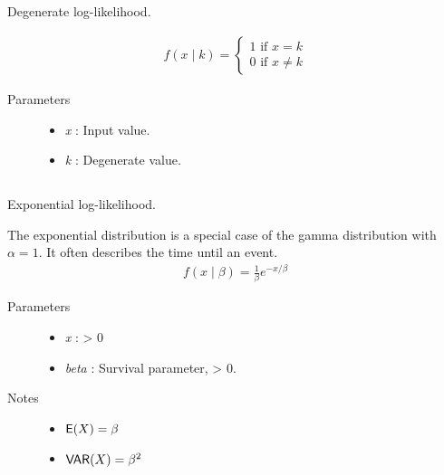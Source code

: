 \documentclass[]{jss}
\begin{document}
\subsection[degenerate]{}

Degenerate log-likelihood.

\begin{eqnarray*}
f(x \mid k) = \left\{ \begin{matrix} 1 \text{ if } x = k \\ 0 \text{ if } x \ne k\end{matrix} \right.    
\end{eqnarray*}

\begin{description}
\item[Parameters] \leavevmode\begin{itemize}
\item {} 
\emph{x} : Input value.

\item {} 
\emph{k} : Degenerate value.

\end{itemize}

\end{description}


\subsection[exponential]{ }

Exponential log-likelihood.

The exponential distribution is a special case of the gamma distribution
with $\alpha=1$. It often describes the time until an event.
\begin{eqnarray*}
f(x \mid \beta) = \frac{1}{\beta}e^{-x/\beta}    
\end{eqnarray*}

\begin{description}
\item[Parameters] \leavevmode\begin{itemize}
\item {} 
\emph{x} : \textgreater{} 0

\item {} 
\emph{beta} : Survival parameter, \textgreater{} 0.

\end{itemize}

\item[Notes]\leavevmode\begin{itemize}
\item {} 
$\mathsf{E}(X) = \beta$

\item {} 
$\mathsf{VAR}(X) = \beta^2$

\end{itemize}

\end{description}
\end{document}

